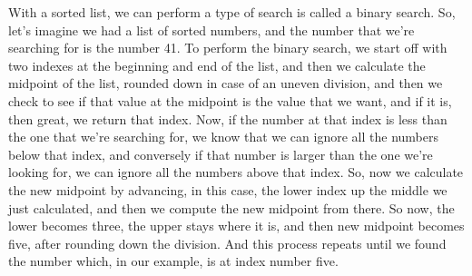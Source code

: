 With a sorted list, we can perform a type of search is called a binary search. So, let's 
imagine we had a list of sorted numbers, and the number that we're searching for is the number
 41. To perform the binary search, we start off with two indexes at the beginning and end of 
 the list, and then we calculate the midpoint of the list, rounded down in case of an uneven 
 division, and then we check to see if that value at the midpoint is the value that we want, 
 and if it is, then great, we return that index. Now, if the number at that index is less than
  the one that we're searching for, we know that we can ignore all the numbers below that 
  index, and conversely if that number is larger than the one we're looking for, we can ignore
   all the numbers above that index. So, now we calculate the new midpoint by advancing, in 
   this case, the lower index up the middle we just calculated, and then we compute the new 
   midpoint from there. So now, the lower becomes three, the upper stays where it is, and then 
   new midpoint becomes five, after rounding down the division. And this process repeats until 
   we found the number which, in our example, is at index number five. 